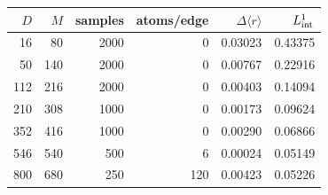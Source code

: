 \begin{tabular}{rrrrrr}
\hline\hline
$D$ & $M$ & samples & atoms/edge & $\Delta\langle r\rangle$ & $L^1_{\rm int}$ \\
\hline
16 & 80 & 2000 & 0 & 0.03023 & 0.43375 \\
50 & 140 & 2000 & 0 & 0.00767 & 0.22916 \\
112 & 216 & 2000 & 0 & 0.00403 & 0.14094 \\
210 & 308 & 1000 & 0 & 0.00173 & 0.09624 \\
352 & 416 & 1000 & 0 & 0.00290 & 0.06866 \\
546 & 540 & 500 & 6 & 0.00024 & 0.05149 \\
800 & 680 & 250 & 120 & 0.00423 & 0.05226 \\
\hline\hline
\end{tabular}
